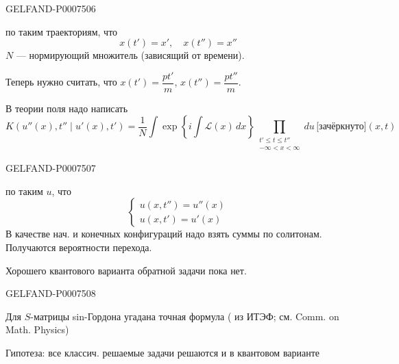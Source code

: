 \begin{GelfandAdjacentEvidence}{GELFAND-P000750}{6}

по таким траекториям, что
\begin{equation*}
x(t')=x',\quad x(t'')=x''
\tag{35}
\end{equation*}
\(N\) --- нормирующий множитель (зависящий от времени).

Теперь нужно считать, что \(x(t')=\dfrac{pt'}m\), \(x(t'')=\dfrac{pt''}m\).

В теории поля надо написать
\begin{equation*}
K(u''(x),t''\mid u'(x),t')=\frac1N\int
\exp\left\{i\int\mathcal L(x)\,dx\right\}
\prod_{\substack{t'\leq t\leq t''\\-\infty<x<\infty}}
du\,\text{[зачёркнуто]}(x,t)
\tag{36}
\end{equation*}
\end{GelfandAdjacentEvidence}
\begin{GelfandAdjacentEvidence}{GELFAND-P000750}{7}

по таким \(u\), что
\begin{equation*}
\begin{cases}
u(x,t'')=u''(x)\\
u(x,t')=u'(x)
\end{cases}
\tag{37}
\end{equation*}
В качестве нач. и конечных конфигураций надо взять суммы по солитонам. Получаются вероятности перехода.

Хорошего квантового варианта обратной задачи пока нет.
\end{GelfandAdjacentEvidence}
\begin{GelfandAdjacentEvidence}{GELFAND-P000750}{8}


Для \(S\)-матрицы sin-Гордона угадана точная формула
( из ИТЭФ; см. Comm. on Math. Physics)

\end{GelfandAdjacentEvidence}

Гипотеза: все классич. решаемые задачи решаются и в квантовом варианте



